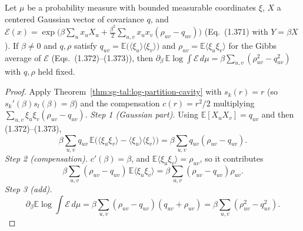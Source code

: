 \begin{theorem}\label{thm:sg-tal:vector-free-energy-beta}
\leanok
{}
Let $\mu$ be a probability measure with bounded measurable coordinates $\xi$, $X$ a centered Gaussian vector of covariance $q$, and $\mathcal E(x)=\exp\bigl(\beta\sum_ux_uX_u+\frac{\beta^2}2\sum_{u,v}x_ux_v(\rho_{uv}-q_{uv})\bigr)$ (Eq.~(1.371) with $Y=\beta X$). If $\beta\ne0$ and $q,\rho$ satisfy $q_{uv}=\mathbb E\bigl(\langle\xi_u\rangle\langle\xi_v\rangle\bigr)$ and $\rho_{uv}=\mathbb E\langle\xi_u\xi_v\rangle$ for the Gibbs average of $\mathcal E$ (Eqs.~(1.372)--(1.373)), then $\partial_\beta\,\mathbb E\log\int\mathcal E\,d\mu=\beta\sum_{u,v}(\rho_{uv}^2-q_{uv}^2)$ with $q,\rho$ held fixed.
\end{theorem}
\begin{proof}
\leanok
Apply Theorem~\ref{thm:sg-tal:log-partition-cavity} with $s_k(r)=r$ (so $s_k'(\beta)s_l(\beta)=\beta$) and the compensation $c(r)=r^2/2$ multiplying $\sum_{u,v}\xi_u\xi_v(\rho_{uv}-q_{uv})$.
\emph{Step 1 (Gaussian part).} Using $\mathbb E[X_uX_v]=q_{uv}$ and then (1.372)--(1.373),
\[
\beta\sum_{u,v}q_{uv}\,\mathbb E\big(\langle\xi_u\xi_v\rangle-\langle\xi_u\rangle\langle\xi_v\rangle\big)=\beta\sum_{u,v}q_{uv}(\rho_{uv}-q_{uv}).
\]
\emph{Step 2 (compensation).} $c'(\beta)=\beta$, and $\mathbb E\langle\xi_u\xi_v\rangle=\rho_{uv}$, so it contributes
\[
\beta\sum_{u,v}(\rho_{uv}-q_{uv})\,\mathbb E\langle\xi_u\xi_v\rangle=\beta\sum_{u,v}(\rho_{uv}-q_{uv})\rho_{uv}.
\]
\emph{Step 3 (add).}
\[
\partial_\beta\mathbb E\log\int\mathcal E\,d\mu=\beta\sum_{u,v}(\rho_{uv}-q_{uv})(q_{uv}+\rho_{uv})=\beta\sum_{u,v}(\rho_{uv}^2-q_{uv}^2).
\]
\end{proof}


